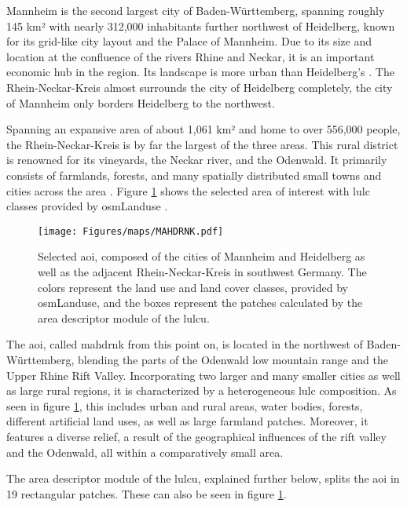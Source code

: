 Mannheim is the second largest city of Baden-Württemberg, spanning roughly 145 km² with nearly 312,000 inhabitants further northwest of Heidelberg, known for its grid-like city layout and the Palace of Mannheim. Due to its size and location at the confluence of the rivers Rhine and Neckar, it is an important economic hub in the region. Its landscape is more urban than Heidelberg's \autocite{Mannheim2024}. The Rhein-Neckar-Kreis almost surrounds the city of Heidelberg completely, the city of Mannheim only borders Heidelberg to the northwest.

Spanning an expansive area of about 1,061 km² and home to over 556,000 people, the Rhein-Neckar-Kreis is by far the largest of the three areas. This rural district is renowned for its vineyards, the Neckar river, and the Odenwald. It primarily consists of farmlands, forests, and many spatially distributed small towns and cities across the area \autocite{Rhine-Neckar2024,Rhein-Neckar-Kreis2024}. Figure \ref{fig:mahdrnk} shows the selected area of interest with \gls{lulc} classes provided by \gls{osm}Landuse \autocite{Schultz.Voss.ea2017}.

\begin{figure}[htb]
    \centering
    \texttt{[image: Figures/maps/MAHDRNK.pdf]}
    \caption[Overview over the  ]{Selected \gls{aoi}, composed of the cities of Mannheim and Heidelberg as well as the adjacent Rhein-Neckar-Kreis in southwest Germany. The colors represent the land use and land cover classes, provided by \gls{osm}Landuse, and the boxes represent the patches calculated by the area descriptor module of the \gls{lulcu}.}
    \label{fig:mahdrnk}
\end{figure}

The \gls{aoi}, called \gls{mahdrnk} from this point on, is located in the northwest of Baden-Württemberg, blending the parts of the Odenwald low mountain range and the Upper Rhine Rift Valley. Incorporating two larger and many smaller cities as well as large rural regions, it is characterized by a heterogeneous \gls{lulc} composition. As seen in figure \ref{fig:mahdrnk}, this includes urban and rural areas, water bodies, forests, different artificial land uses, as well as large farmland patches. Moreover, it features a diverse relief, a result of the geographical influences of the rift valley and the Odenwald, all within a comparatively small area.

The area descriptor module of the \gls{lulcu}, explained further below, splits the \gls{aoi} in 19 rectangular patches. These can also be seen in figure \ref{fig:mahdrnk}. 

